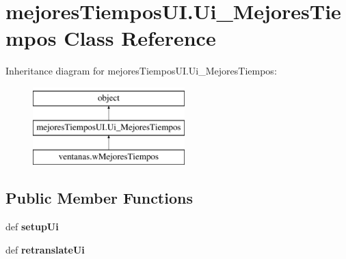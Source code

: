 \hypertarget{classmejores_tiempos_u_i_1_1_ui___mejores_tiempos}{\section{mejores\-Tiempos\-U\-I.\-Ui\-\_\-\-Mejores\-Tiempos Class Reference}
\label{classmejores_tiempos_u_i_1_1_ui___mejores_tiempos}
}
Inheritance diagram for mejores\-Tiempos\-U\-I.\-Ui\-\_\-\-Mejores\-Tiempos\-:\begin{figure}[H]
\begin{center}
\leavevmode
\includegraphics[height=3.000000cm]{classmejores_tiempos_u_i_1_1_ui___mejores_tiempos}
\end{center}
\end{figure}
\subsection*{Public Member Functions}
\begin{DoxyCompactItemize}
\item 
\hypertarget{classmejores_tiempos_u_i_1_1_ui___mejores_tiempos_a6bb0f6b347b6fd5c57628191ef6e454e}{def {\bfseries setup\-Ui}}\label{classmejores_tiempos_u_i_1_1_ui___mejores_tiempos_a6bb0f6b347b6fd5c57628191ef6e454e}

\item 
\hypertarget{classmejores_tiempos_u_i_1_1_ui___mejores_tiempos_a6635519238cb6b3fa06d8251cb802204}{def {\bfseries retranslate\-Ui}}\label{classmejores_tiempos_u_i_1_1_ui___mejores_tiempos_a6635519238cb6b3fa06d8251cb802204}

\end{DoxyCompactItemize}
